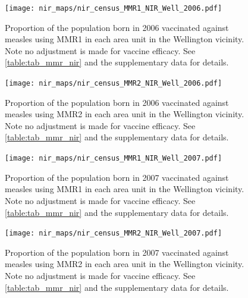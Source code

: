 \documentclass{article}
\begin{document}
% 
\begin{figure}
   \begin{center}
    \texttt{[image: nir\_maps/nir\_census\_MMR1\_NIR\_Well\_2006.pdf]}
    \end{center}
    \caption{Proportion of the population born in 2006 vaccinated against measles using MMR1 in each area unit in the Wellington vicinity. Note no adjustment is made for vaccine efficacy. See \autoref{table:tab_mmr_nir} and the supplementary data for details.}
\label{fig:fig12006_w}
\end{figure}
% 
\begin{figure}
\begin{center}
\texttt{[image: nir\_maps/nir\_census\_MMR2\_NIR\_Well\_2006.pdf]}
\end{center}
    \caption{Proportion of the population born in 2006 vaccinated against measles using MMR2 in each area unit in the Wellington vicinity. Note no adjustment is made for vaccine efficacy. See \autoref{table:tab_mmr_nir} and the supplementary data for details.}
\label{fig:fig22006_w}
\end{figure}
% 
% 
\begin{figure}
\begin{center}
\texttt{[image: nir\_maps/nir\_census\_MMR1\_NIR\_Well\_2007.pdf]}
\end{center}
    \caption{Proportion of the population born in 2007 vaccinated against measles using MMR1 in each area unit in the Wellington vicinity. Note no adjustment is made for vaccine efficacy. See \autoref{table:tab_mmr_nir} and the supplementary data for details.}
\label{fig:fig12007_w}
\end{figure}
\begin{figure}
\begin{center}
    \texttt{[image: nir\_maps/nir\_census\_MMR2\_NIR\_Well\_2007.pdf]}
\end{center}
    \caption{Proportion of the population born in 2007 vaccinated against measles using MMR2 in each area unit in the Wellington vicinity. Note no adjustment is made for vaccine efficacy. See \autoref{table:tab_mmr_nir} and the supplementary data for details.}
\label{fig:fig22007_w}
\end{figure}
\end{document}

